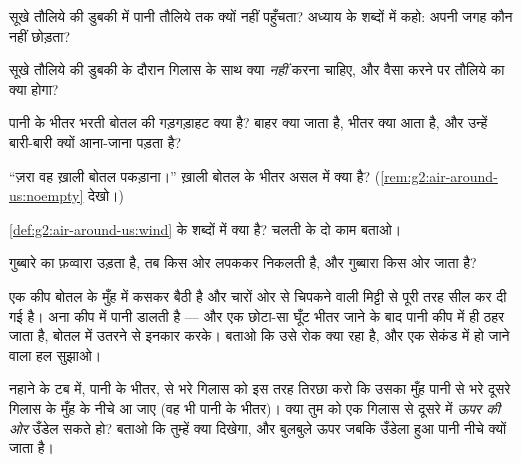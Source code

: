 \begin{exercise}[$\star$]\label{exo:g2:air-around-us:3}
सूखे तौलिये की डुबकी में पानी तौलिये तक क्यों नहीं पहुँचता? अध्याय
के शब्दों में कहो: अपनी जगह कौन नहीं छोड़ता?
\end{exercise}

\begin{exercise}[$\star$]\label{exo:g2:air-around-us:4}
सूखे तौलिये की डुबकी के दौरान गिलास के साथ क्या \emph{नहीं} करना
चाहिए, और वैसा करने पर तौलिये का क्या होगा?
\end{exercise}

\begin{exercise}[$\star$]\label{exo:g2:air-around-us:5}
पानी के भीतर भरती बोतल की गड़गड़ाहट क्या है? बाहर क्या जाता है, भीतर
क्या आता है, और उन्हें बारी-बारी क्यों आना-जाना पड़ता है?
\end{exercise}

\begin{exercise}[$\star$]\label{exo:g2:air-around-us:6}
``ज़रा वह ख़ाली बोतल पकड़ाना।'' ख़ाली बोतल के भीतर असल में क्या है?
(\cref{rem:g2:air-around-us:noempty} देखो।)
\end{exercise}

\begin{exercise}[$\star$]\label{exo:g2:air-around-us:7}
\cref{def:g2:air-around-us:wind} के शब्दों में  क्या है? चलती 
के दो काम बताओ।
\end{exercise}

\begin{exercise}[$\star$]\label{exo:g2:air-around-us:8}
गुब्बारे का फ़व्वारा उड़ता है, तब  किस ओर लपककर निकलती है, और
गुब्बारा किस ओर जाता है?
\end{exercise}

\begin{exercise}[$\star\star$]\label{exo:g2:air-around-us:9}
एक कीप बोतल के मुँह में कसकर बैठी है और चारों ओर से चिपकने वाली
मिट्टी से पूरी तरह सील कर दी गई है। अना कीप में पानी डालती है ---
और एक छोटा-सा घूँट भीतर जाने के बाद पानी कीप में ही ठहर जाता है,
बोतल में उतरने से इनकार करके। बताओ कि उसे रोक क्या रहा है, और एक
सेकंड में हो जाने वाला हल सुझाओ।
\end{exercise}

\begin{exercise}[$\star\star$]\label{exo:g2:air-around-us:10}
नहाने के टब में, पानी के भीतर,  से भरे गिलास को इस तरह तिरछा करो
कि उसका मुँह पानी से भरे दूसरे गिलास के मुँह के नीचे आ जाए (वह भी
पानी के भीतर)। क्या तुम  को एक गिलास से दूसरे में \emph{ऊपर की
ओर} उँडेल सकते हो? बताओ कि तुम्हें क्या दिखेगा, और बुलबुले ऊपर जबकि
उँडेला हुआ पानी नीचे क्यों जाता है।
\end{exercise}
